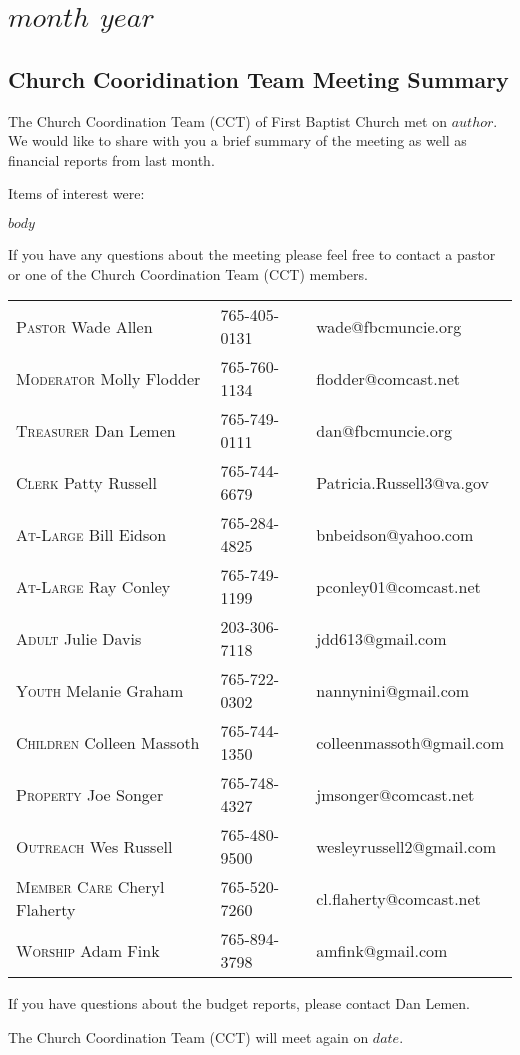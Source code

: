 \documentclass[Letter, 11pt, twoside]{report}
\begin{document}
\part{$month$ $year$}
\chapter{Church Cooridination Team Meeting Summary}

The Church Coordination Team (CCT) of First Baptist Church met on $author$. We would like to share with you a brief summary of the meeting as well as financial reports from last month.

Items of interest were:

$body$

If you have any questions about the meeting please feel free to contact a pastor or one of the Church Coordination Team (CCT) members.

\begin{tabular}{@{}lll}
\textsc{Pastor} Wade Allen & 765-405-0131 & wade@fbcmuncie.org\\
\textsc{Moderator} Molly Flodder & 765-760-1134 & flodder@comcast.net\\
\textsc{Treasurer} Dan Lemen & 765-749-0111 & dan@fbcmuncie.org\\
\textsc{Clerk} Patty Russell & 765-744-6679 & Patricia.Russell3@va.gov \\
\textsc{At-Large} Bill Eidson & 765-284-4825 & bnbeidson@yahoo.com \\
\textsc{At-Large} Ray Conley & 765-749-1199 & pconley01@comcast.net\\
\textsc{Adult} Julie Davis & 203-306-7118  & jdd613@gmail.com\\
\textsc{Youth} Melanie Graham & 765-722-0302 & nannynini@gmail.com\\
\textsc{Children} Colleen Massoth & 765-744-1350 & colleenmassoth@gmail.com\\
\textsc{Property} Joe Songer & 765-748-4327 & jmsonger@comcast.net\\
\textsc{Outreach} Wes Russell & 765-480-9500 & wesleyrussell2@gmail.com\\
\textsc{Member Care} Cheryl Flaherty & 765-520-7260 & cl.flaherty@comcast.net \\
  \textsc{Worship} Adam Fink & 765-894-3798  & amfink@gmail.com \\ 
\end{tabular}

If you have questions about the budget reports, please contact  
Dan Lemen.

The Church Coordination Team (CCT) will meet again on $date$. 




\end{document}
